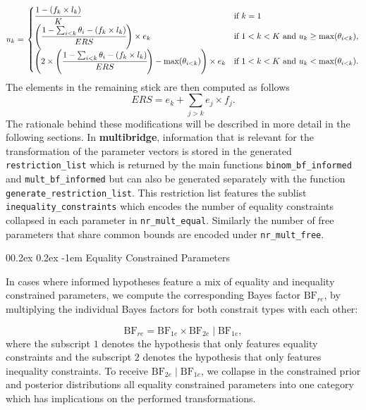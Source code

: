 \documentclass[
  english,
  man,floatsintext]{apa6}
\makeatletter
\let\oldparagraph\paragraph
\renewcommand{\paragraph}[1]{\oldparagraph{#1}\mbox{}}
\renewcommand{\paragraph}{\@startsection{paragraph}{4}{\parindent}%
  {0\baselineskip \@plus 0.2ex \@minus 0.2ex}%
  {-1em}%
  {\normalfont\normalsize\bfseries\itshape\typesectitle}}
\makeatother
\begin{document}
\begin{appendix}
\begin{align}
u_k = \left.
\begin{cases}
\cfrac{1 - (f_k \times l_k)}{K} & \text{if } k = 1 \\
\left( \cfrac{1 - \sum_{i < k} \theta_i - (f_k \times l_k)}{ERS} \right) \times e_k & \text{if } 1 < k < K \text{ and } u_k \geq \text{max}(\theta_{i < k}), \\
\left( 2 \times \left( \cfrac{1 - \sum_{i < k} \theta_i - (f_k \times l_k)}{ERS} \right) - \text{max}(\theta_{i < k}) \right)  \times e_k & \text{if } 1 < k < K \text{ and } u_k < \text{max}(\theta_{i < k}).
\end{cases}
\right.
\end{align} The elements in the remaining stick are then computed as
follows \[ERS = e_k + \sum_{j > k} e_j \times f_j.\] The rationale
behind these modifications will be described in more detail in the
following sections. In \textbf{multibridge}, information that is
relevant for the transformation of the parameter vectors is stored in
the generated \texttt{restriction\_list} which is returned by the main
functions \texttt{binom\_bf\_informed} and \texttt{mult\_bf\_informed}
but can also be generated separately with the function
\texttt{generate\_restriction\_list}. This restriction list features the
sublist \texttt{inequality\_constraints} which encodes the number of
equality constraints collapsed in each parameter in
\texttt{nr\_mult\_equal}. Similarly the number of free parameters that
share common bounds are encoded under \texttt{nr\_mult\_free}.

\hypertarget{equality-constrained-parameters}{%
\paragraph{Equality Constrained
Parameters}\label{equality-constrained-parameters}}

In cases where informed hypotheses feature a mix of equality and
inequality constrained parameters, we compute the corresponding Bayes
factor \(\text{BF}_{re}\), by multiplying the individual Bayes factors
for both constrait types with each other:

\[
\text{BF}_{re}
= \text{BF}_{1e} \times \text{BF}_{2e} \mid \text{BF}_{1e},
\] where the subscript \(1\) denotes the hypothesis that only features
equality constraints and the subscript \(2\) denotes the hypothesis that
only features inequality constraints. To receive
\(\text{BF}_{2e} \mid \text{BF}_{1e}\), we collapse in the constrained
prior and posterior distributions all equality constrained parameters
into one category which has implications on the performed
transformations.


\end{appendix}
\end{document}
